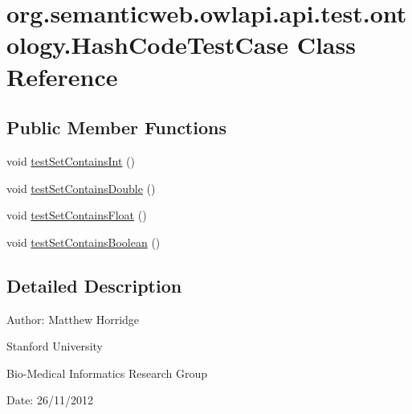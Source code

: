 \hypertarget{classorg_1_1semanticweb_1_1owlapi_1_1api_1_1test_1_1ontology_1_1_hash_code_test_case}{\section{org.\-semanticweb.\-owlapi.\-api.\-test.\-ontology.\-Hash\-Code\-Test\-Case Class Reference}
\label{classorg_1_1semanticweb_1_1owlapi_1_1api_1_1test_1_1ontology_1_1_hash_code_test_case}
}
\subsection*{Public Member Functions}
\begin{DoxyCompactItemize}
\item 
void \hyperlink{classorg_1_1semanticweb_1_1owlapi_1_1api_1_1test_1_1ontology_1_1_hash_code_test_case_ae4dae4f8dc046e9f04467c0ec03cfa83}{test\-Set\-Contains\-Int} ()
\item 
void \hyperlink{classorg_1_1semanticweb_1_1owlapi_1_1api_1_1test_1_1ontology_1_1_hash_code_test_case_ae5b38d2a98e56082bab1d8a0f33decda}{test\-Set\-Contains\-Double} ()
\item 
void \hyperlink{classorg_1_1semanticweb_1_1owlapi_1_1api_1_1test_1_1ontology_1_1_hash_code_test_case_a114e817698bccb4bdb1e2bdbb3b06f72}{test\-Set\-Contains\-Float} ()
\item 
void \hyperlink{classorg_1_1semanticweb_1_1owlapi_1_1api_1_1test_1_1ontology_1_1_hash_code_test_case_adda9f447bf4c7ee0f3b7a25742be7fed}{test\-Set\-Contains\-Boolean} ()
\end{DoxyCompactItemize}


\subsection{Detailed Description}
Author\-: Matthew Horridge\par
 Stanford University\par
 Bio-\/\-Medical Informatics Research Group\par
 Date\-: 26/11/2012 

